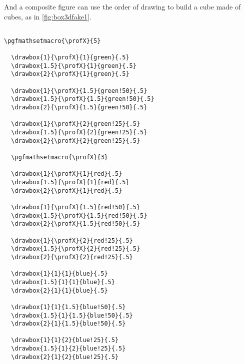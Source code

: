 And a composite figure can use the order of drawing to build a cube made of cubes, as in \autoref{fig:box3dfake1}.

\begin{lstlisting}[style=myLaTeX,caption=A cube made of cubes]

\pgfmathsetmacro{\profX}{5}

  \drawbox{1}{\profX}{1}{green}{.5}
  \drawbox{1.5}{\profX}{1}{green}{.5}
  \drawbox{2}{\profX}{1}{green}{.5}

  \drawbox{1}{\profX}{1.5}{green!50}{.5}
  \drawbox{1.5}{\profX}{1.5}{green!50}{.5}
  \drawbox{2}{\profX}{1.5}{green!50}{.5}

  \drawbox{1}{\profX}{2}{green!25}{.5}
  \drawbox{1.5}{\profX}{2}{green!25}{.5}
  \drawbox{2}{\profX}{2}{green!25}{.5}

  \pgfmathsetmacro{\profX}{3}

  \drawbox{1}{\profX}{1}{red}{.5}
  \drawbox{1.5}{\profX}{1}{red}{.5}
  \drawbox{2}{\profX}{1}{red}{.5}

  \drawbox{1}{\profX}{1.5}{red!50}{.5}
  \drawbox{1.5}{\profX}{1.5}{red!50}{.5}
  \drawbox{2}{\profX}{1.5}{red!50}{.5}

  \drawbox{1}{\profX}{2}{red!25}{.5}
  \drawbox{1.5}{\profX}{2}{red!25}{.5}
  \drawbox{2}{\profX}{2}{red!25}{.5}

  \drawbox{1}{1}{1}{blue}{.5}
  \drawbox{1.5}{1}{1}{blue}{.5}
  \drawbox{2}{1}{1}{blue}{.5}

  \drawbox{1}{1}{1.5}{blue!50}{.5}
  \drawbox{1.5}{1}{1.5}{blue!50}{.5}
  \drawbox{2}{1}{1.5}{blue!50}{.5}

  \drawbox{1}{1}{2}{blue!25}{.5}
  \drawbox{1.5}{1}{2}{blue!25}{.5}
  \drawbox{2}{1}{2}{blue!25}{.5}

\end{lstlisting}

